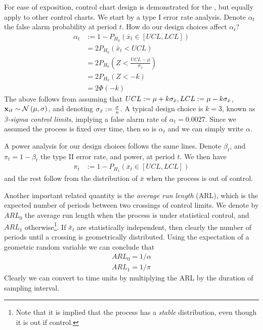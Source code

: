 For ease of exposition, control chart design is demonstrated for the \barxChart, but equally apply to other control charts.
We start by a type I error rate analysis. 
Denote $\alpha_t$ the false alarm probability at period $t$.
How do our design choices affect $\alpha_t$?
\begin{align}
	\alpha_t &:= 1-P_{H_0}(\bar{x}_t \in [UCL,LCL]) \\
	&= 2 P_{H_0}(\bar{x}_t<UCL) \\
	&= 2 P_{H_0}(Z<\frac{UCL-\mu}{\sigma_{\bar{x}}}) \\
	&= 2 P_{H_0}(Z < -k) \\
	&= 2 \Phi(-k)
\end{align}
The above follows from assuming that $UCL:=\mu + k \sigma_{\bar{x}}, LCL:= \mu - k \sigma_{\bar{x}}$, $\mathbf{x}_{it}\sim \mathcal{N}\left(\mu,\sigma\right)$, and denoting $\sigma_{\bar{x}}:= \frac{\sigma}{n}$.
A typical design choice is $k=3$, known as \emph{3-sigma control limits}, implying a false alarm rate of $\alpha_t=0.0027$.
Since we assumed the process is fixed over time, then so is $\alpha_t$ and we can simply write $\alpha$.

A power analysis for our design choices follows the same lines.
Denote $\beta_t$, and $\pi_t=1-\beta_t$ the type II error rate, and power, at period $t$.
We then have
\begin{align}
	\pi_t &:= 1-P_{H_1}(\bar{x}_t \in [UCL,LCL])
\end{align}
and the rest follow from the distribution of $\bar{x}$ when the process is out of control.



Another important related quantity is the \emph{average run length} (ARL), which is the expected number of periods between two crossings of control limits. 
We denote by $ARL_0$ the average run length when the process is under statistical control, and $ARL_1$ otherwise\footnote{Note that it is implied that the process has a \emph{stable} distribution, even though it is out if control.}. 
If $\bar{x}_t$ are statistically independent, then clearly the number of periods until a crossing is geometrically distributed. Using the expectation of a geometric random variable we can conclude that 
\begin{align}
	ARL_0=1/\alpha \\
	ARL_1=1/\pi
\end{align}
Clearly we can convert to time units by multiplying the ARL by the duration of sampling interval.


